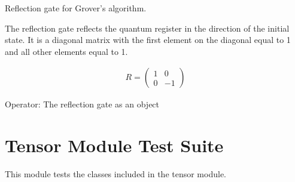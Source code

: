\documentclass[letterpaper,10pt,english]{sphinxmanual}
\begin{document}
\begin{fulllineitems}
\begin{fulllineitems}
\begin{description}
\end{description}

\end{fulllineitems}


\begin{fulllineitems}
\label{\detokenize{index:gates.Gate.reflection}}
\pysigstartsignatures
{}
\pysigstopsignatures
\sphinxAtStartPar
Reflection gate for Grover’s algorithm.

\sphinxAtStartPar
The reflection gate reflects the quantum register in the direction 
of the initial state. 
It is a diagonal matrix with the first element on the diagonal
equal to 1 and all other elements equal to \sphinxhyphen{}1.

\sphinxAtStartPar
{}
\begin{equation*}
\begin{split}R = 
    \begin{pmatrix}
        1 & 0 \\
        0 & -1
    \end{pmatrix}\end{split}
\end{equation*}\begin{description}
\sphinxAtStartPar
Operator: The reflection gate as an  object

\end{description}

\end{fulllineitems}


\end{fulllineitems}


\chapter{Tensor Module Test Suite}
\label{\detokenize{index:tensor-module-test-suite}}\label{\detokenize{index:module-tests.test_tensor}}
\sphinxAtStartPar
This module tests the classes included in the tensor module.
\end{document}

